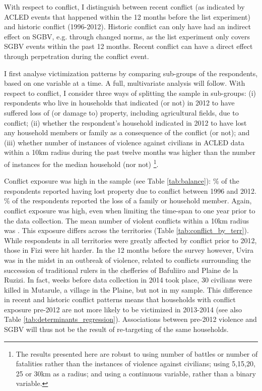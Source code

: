 With respect to conflict, I distinguish between recent conflict (as indicated by ACLED events that happened within the 12 months before the list experiment) and historic conflict (1996-2012). Historic conflict can only have had an indirect effect on SGBV, e.g. through changed norms, as the list experiment only covers SGBV events within the past 12 months. Recent conflict can have a direct effect through perpetration during the conflict event. 

I first analyse victimization patterns by comparing sub-groups of the respondents, based on one variable at a time. A full, multivariate analysis will follow. With respect to conflict, I consider three ways of splitting the sample in sub-groups: (i) respondents who live in households that indicated (or not) in 2012 to have suffered loss of (or damage to) property, including agricultural fields, due to conflict; (ii) whether the respondent's household indicated in 2012 to have lost any household members or family as a consequence of the conflict (or not); and (iii) whether number of instances of violence against civilians in ACLED data within a 10km radius during the past twelve months was higher than the number of instances for the median household (nor not) \footnote{The results presented here are robust to using number of battles or number of fatalities rather than the instances of violence against civilians; using 5,15,20, 25 or 30km as a radius; and using a continuous variable, rather than a binary variable.}. 

Conflict exposure was high in the sample (see Table \ref{tab:balance}): \% of the respondents reported having lost property due to conflict between 1996 and 2012.  \% of the respondents reported the loss of a family or household member. Again, conflict exposure was high, even when limiting the time-span to one year prior to the data collection. The mean number of violent conflicts within a 10km radius was . This exposure differs across the territories (Table \ref{tab:conflict_by_terr}). While respondents in all territories were greatly affected by conflict prior to 2012, those in Fizi were hit harder. In the 12 months before the survey however, Uvira was in the midst in an outbreak of violence, related to conflicts surrounding the succession of traditional rulers in the chefferies of Bafuliiro and Plaine de la Ruzizi. In fact, weeks before data collection in 2014 took place, 30 civilians were killed in Mutarule, a village in the Plaine, but not in my sample. This difference in recent and historic conflict patterns means that households with conflict exposure pre-2012 are not more likely to be victimized in 2013-2014 (see also Table \ref{tab:determinants_regression}). Associations between pre-2012 violence and SGBV will thus not be the result of re-targeting of the same households.

